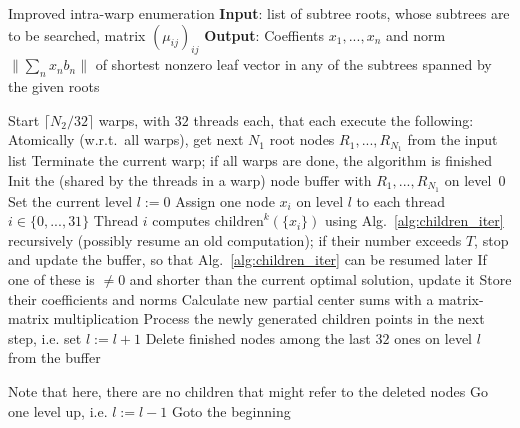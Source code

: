 \documentclass{scrartcl}
\begin{document}
    \begin{algorithm}
        \caption{
            Improved intra-warp enumeration\label{alg:warp_enum_complex}
            \newline
            \textbf{Input}: list of subtree roots, whose subtrees are to be searched, matrix $(\mu_{ij})_{ij}$
            \newline
            \textbf{Output}: Coeffients $x_1, ..., x_n$ and norm $\| \sum_n x_n b_n \|$ of shortest nonzero leaf vector in any of the subtrees spanned by the given roots
        }
        \begin{algorithmic}
            \STATE Start $\lceil N_2 / 32 \rceil$ warps, with $32$ threads each, that each execute the following:
            \STATE Atomically (w.r.t.\ all warps), get next $N_1$ root nodes $R_1, ..., R_{N_1}$ from the input list
                \STATE Terminate the current warp; if all warps are done, the algorithm is finished
            \ENDIF
            \STATE Init the (shared by the threads in a warp) node buffer with $R_1, ..., R_{N_1}$ on level~0
            \STATE Set the current level $l := 0$
                    \STATE Assign one node $x_i$ on level $l$ to each thread $i \in \{0, ..., 31\}$
                    \STATE Thread $i$ computes $\mathrm{children}^k(\{x_i\})$ using Alg.\ \ref{alg:children_iter} recursively (possibly resume an old computation);
                    if their number exceeds $T$, stop and update the buffer, so that Alg.\ \ref{alg:children_iter} can be resumed later
                        \STATE If one of these is $\neq 0$ and shorter than the current optimal solution, update it
                    \ELSE
                        \STATE Store their coefficients and norms
                        \STATE Calculate new partial center sums with a matrix-matrix multiplication
                    \ENDIF
                \ENDWHILE
                    \STATE Process the newly generated children points in the next step, i.e. set $l := l + 1$
                \ELSE
                    \STATE Delete finished nodes among the last $32$ ones on level $l$ from the buffer

                    Note that here, there are no children that might refer to the deleted nodes
                        \STATE Go one level up, i.e. $l := l - 1$
                    \ENDIF
                \ENDIF
            \ENDWHILE
            \STATE Goto the beginning
        \end{algorithmic}
    \end{algorithm}
\end{document}
